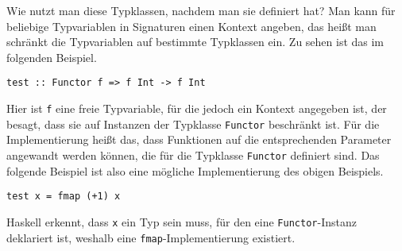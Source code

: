 Wie nutzt man diese Typklassen, nachdem man sie definiert hat? Man kann für beliebige Typvariablen in Signaturen einen Kontext
angeben, das heißt man schränkt die Typvariablen auf bestimmte Typklassen ein. Zu sehen ist das im folgenden Beispiel.

\begin{verbatim}
test :: Functor f => f Int -> f Int
\end{verbatim}

Hier ist \texttt{f} eine freie Typvariable, für die jedoch ein Kontext angegeben ist, der besagt, dass sie auf Instanzen
der Typklasse \texttt{Functor} beschränkt ist. Für die Implementierung heißt das, dass Funktionen auf die entsprechenden
Parameter angewandt werden können, die für die Typklasse \texttt{Functor} definiert sind. Das folgende Beispiel ist also
eine mögliche Implementierung des obigen Beispiels.

\begin{verbatim}
test x = fmap (+1) x
\end{verbatim}

Haskell erkennt, dass \texttt{x} ein Typ sein muss, für den eine \texttt{Functor}-Instanz deklariert ist, weshalb eine
\texttt{fmap}-Implementierung existiert.